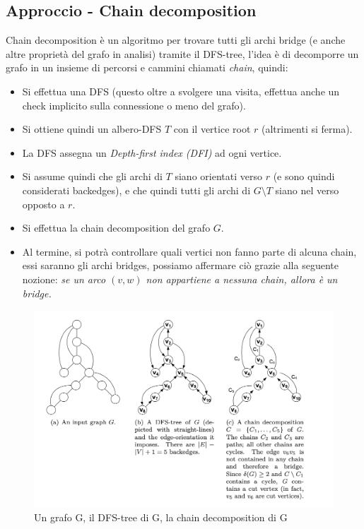 \documentclass[12pt,a4paper]{article}
\begin{document}
\subsection{Approccio - Chain decomposition}
Chain decomposition è un algoritmo per trovare tutti gli archi bridge (e anche altre proprietà del grafo in analisi) tramite il DFS-tree, l'idea è di decomporre un grafo in un insieme di percorsi e cammini chiamati \textit{chain}, quindi:
\begin{itemize}
\item Si effettua una DFS (questo oltre a svolgere una visita, effettua anche un check implicito sulla connessione o meno del grafo).
\item Si ottiene quindi un albero-DFS $T$ con il vertice root $r$ (altrimenti si ferma).
\item La DFS assegna un \textit{Depth-first index (DFI)} ad ogni vertice.
\item Si assume quindi che gli archi di $T$ siano orientati verso $r$ (e sono quindi considerati backedges), e che quindi tutti gli archi di $G \setminus T$ siano nel verso opposto a $r$.
\item Si effettua la chain decomposition del grafo $G$.
\item Al termine, si potrà controllare quali vertici non fanno parte di alcuna chain, essi saranno gli archi bridges, possiamo affermare ciò grazie alla seguente nozione: \textit{se un arco $(v, w)$ non appartiene a nessuna chain, allora è un bridge.}
\end{itemize}

\begin{figure}[h]
	\centering
	\includegraphics[width=1\linewidth]{img/chain_deco}
	\caption{Un grafo G, il DFS-tree di G, la chain decomposition di G}
	\label{fig:chain_deco}
\end{figure}
\end{document}
